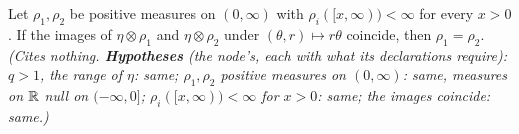 \begin{lemma}
\label{lem:haar-smearing-injective}
\leanok
{}
Let $\rho_1, \rho_2$ be positive measures on $(0,\infty)$ with $\rho_i([x,\infty)) < \infty$ for
every $x > 0$. If the images of $\eta \otimes \rho_1$ and $\eta \otimes \rho_2$ under
$(\theta, r) \mapsto r\theta$ coincide, then $\rho_1 = \rho_2$.
\statusT\quad\emph{(Cites nothing. \textbf{Hypotheses} (the node's, each with what its declarations
require): $q > 1$, the range of $\eta$: same; $\rho_1, \rho_2$ positive measures on $(0,\infty)$: same,
measures on $\mathbb{R}$ null on $(-\infty, 0]$; $\rho_i([x,\infty)) < \infty$ for $x > 0$: same; the
images coincide: same.)}
\end{lemma}

